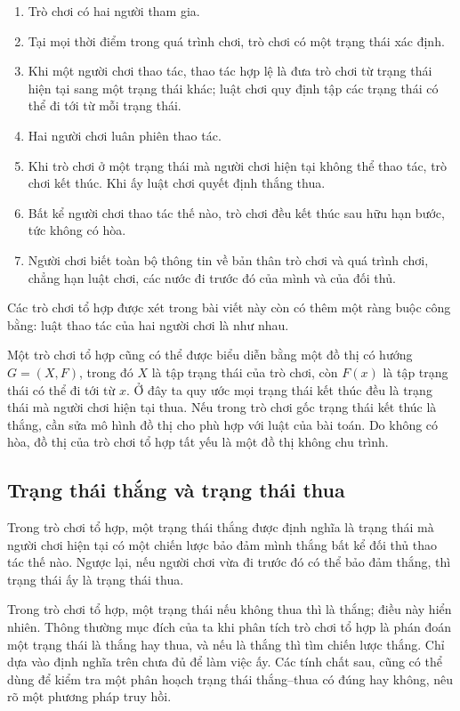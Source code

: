 \documentclass[11pt]{article}
\begin{document}
\begin{enumerate}
  \item Trò chơi có hai người tham gia.
  \item Tại mọi thời điểm trong quá trình chơi, trò chơi có một trạng thái xác
  định.
  \item Khi một người chơi thao tác, thao tác hợp lệ là đưa trò chơi từ trạng
  thái hiện tại sang một trạng thái khác; luật chơi quy định tập các trạng thái
  có thể đi tới từ mỗi trạng thái.
  \item Hai người chơi luân phiên thao tác.
  \item Khi trò chơi ở một trạng thái mà người chơi hiện tại không thể thao
  tác, trò chơi kết thúc. Khi ấy luật chơi quyết định thắng thua.
  \item Bất kể người chơi thao tác thế nào, trò chơi đều kết thúc sau hữu hạn
  bước, tức không có hòa.
  \item Người chơi biết toàn bộ thông tin về bản thân trò chơi và quá trình
  chơi, chẳng hạn luật chơi, các nước đi trước đó của mình và của đối thủ.
\end{enumerate}

Các trò chơi tổ hợp được xét trong bài viết này còn có thêm một ràng buộc công
bằng: luật thao tác của hai người chơi là như nhau.

Một trò chơi tổ hợp cũng có thể được biểu diễn bằng một đồ thị có hướng
\(G=(X,F)\), trong đó \(X\) là tập trạng thái của trò chơi, còn \(F(x)\) là tập
trạng thái có thể đi tới từ \(x\). Ở đây ta quy ước mọi trạng thái kết thúc đều
là trạng thái mà người chơi hiện tại thua. Nếu trong trò chơi gốc trạng thái
kết thúc là thắng, cần sửa mô hình đồ thị cho phù hợp với luật của bài toán.
Do không có hòa, đồ thị của trò chơi tổ hợp tất yếu là một đồ thị không chu
trình.

\subsection{Trạng thái thắng và trạng thái thua}

Trong trò chơi tổ hợp, một trạng thái thắng được định nghĩa là trạng thái mà
người chơi hiện tại có một chiến lược bảo đảm mình thắng bất kể đối thủ thao
tác thế nào. Ngược lại, nếu người chơi vừa đi trước đó có thể bảo đảm thắng,
thì trạng thái ấy là trạng thái thua.

Trong trò chơi tổ hợp, một trạng thái nếu không thua thì là thắng; điều này
hiển nhiên. Thông thường mục đích của ta khi phân tích trò chơi tổ hợp là phán
đoán một trạng thái là thắng hay thua, và nếu là thắng thì tìm chiến lược thắng.
Chỉ dựa vào định nghĩa trên chưa đủ để làm việc ấy. Các tính chất sau, cũng có
thể dùng để kiểm tra một phân hoạch trạng thái thắng--thua có đúng hay không,
nêu rõ một phương pháp truy hồi.
\end{document}
